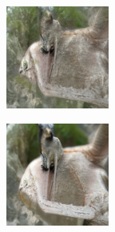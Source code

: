 \documentclass{article}
\begin{document}
\begin{figure}
\begin{subfigure}[b]{0.5\linewidth}
\begin{subfigure}[b]{0.242\linewidth}
        \end{subfigure}
        \hfill
    \end{subfigure}%
    \begin{subfigure}[b]{0.5\linewidth}
        \begin{subfigure}[b]{0.242\linewidth}
        \includegraphics[width=\linewidth]{figures/imagenet128/solver_samples/imagenet128_fm_ot_59_05.png}
        \end{subfigure}
        \begin{subfigure}[b]{0.242\linewidth}
        \includegraphics[width=\linewidth]{figures/imagenet128/solver_samples/imagenet128_fm_ot_59_10.png}

\end{subfigure}
\end{subfigure}
\end{figure}
\end{document}
